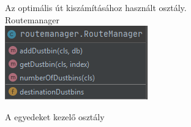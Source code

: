 Az optimális út kiszámításához használt osztály.
\\
Routemanager\\

\includegraphics[scale=0.8]{images/routemanager.png}

A egyedeket kezelő osztály

